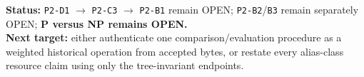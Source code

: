 \documentclass[11pt]{article}
\begin{document}
\medskip
\noindent\textbf{Status:} \texttt{P2-D1} $\longrightarrow$ \texttt{P2-C3} $\longrightarrow$ \texttt{P2-B1} remain OPEN; \texttt{P2-B2}/\texttt{B3} remain separately OPEN; \textbf{P versus NP remains OPEN.}\\
\textbf{Next target:} either authenticate one comparison/evaluation procedure as a weighted historical operation from accepted bytes, or restate every alias-class resource claim using only the tree-invariant endpoints.

\end{document}
